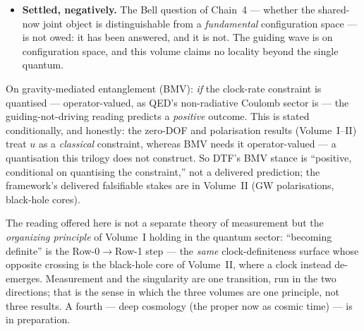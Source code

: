\documentclass[11pt]{article}
\begin{document}
\begin{itemize}[leftmargin=1.4em,itemsep=2pt,topsep=3pt]
    resynchronisation, whose fluctuation is a natural source for the diffusion the amplitude law needs ---
    at a scale $\hbar$ posited as every formulation of quantum mechanics posits it; what is open is whether
    that dynamics \emph{forces} the coefficient $\hbar/2m$ (the factor of $2$). DTF therefore \emph{reduces}
    the Schr\"odinger equation to one posited constant plus one open coefficient; it does not derive it.
    \emph{On single-valuedness, two open items, honestly sized:} (i)~that the Row-0$\to$Row-1 emergence
    through the $u$-clock is a conditioning-type map (which would preserve single-valuedness), still to be
    shown for the specific $u$-clock emergence; and (ii)~the nodal / multiply-connected case, genuinely
    open, because there the single-valuedness posit is a real restriction (spinors, anyons). These are
    smaller than ``Wallstrom is unaddressed'' --- the obstruction is reduced to one declared posit --- but
    larger than a single technical residual.
  \item \textbf{Settled, negatively.} The Bell question of Chain~4 --- whether the shared-now joint object
    is distinguishable from a \emph{fundamental} configuration space --- is not owed: it has
    been answered, and it is not. The guiding wave is on configuration space, and this volume claims no
    locality beyond the single quantum.
\end{itemize}

\noindent On gravity-mediated entanglement (BMV): \emph{if} the clock-rate constraint is quantised ---
operator-valued, as QED's non-radiative Coulomb sector is --- the guiding-not-driving reading predicts a
\emph{positive} outcome. This is stated conditionally, and honestly: the zero-DOF and polarisation
results (Volume~I--II) treat $u$ as a \emph{classical} constraint, whereas BMV needs it operator-valued
--- a quantisation this trilogy does not construct. So DTF's BMV stance is ``positive, conditional on
quantising the constraint,'' not a delivered prediction; the framework's delivered falsifiable stakes are
in Volume~II (GW polarisations, black-hole cores).

\medskip
\noindent The reading offered here is not a separate theory of measurement but the \emph{organizing
principle} of Volume~I holding in the quantum sector: ``becoming definite'' is the Row-0$\to$Row-1 step ---
the \emph{same} clock-definiteness surface whose opposite crossing is the black-hole core of Volume~II,
where a clock instead de-emerges. Measurement and the singularity are one transition, run in the two
directions; that is the sense in which the three volumes are one principle, not three results. A fourth ---
deep cosmology (the proper now as cosmic time) --- is in preparation.
\end{document}
